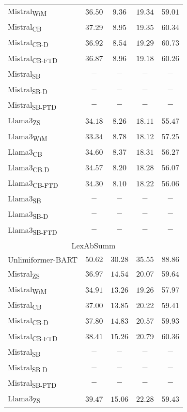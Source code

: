 \begin{table*}
\begin{tabular}{l c c c c}
Mistral\textsubscript{WiM}&$36.50$& $\mathbf{9.36}$& $19.34$& $59.01$\\
Mistral\textsubscript{CB}&$37.29$& $8.95$& $19.35$& $60.34$\\
Mistral\textsubscript{CB-D}&$36.92$& $8.54$& $19.29$& $60.73$\\
Mistral\textsubscript{CB-FTD}&$36.87$& $8.96$& $19.18$& $60.26$\\
Mistral\textsubscript{SB}&$-$& $-$& $-$& $-$\\
Mistral\textsubscript{SB-D}&$-$& $-$& $-$& $-$\\
Mistral\textsubscript{SB-FTD}&$-$& $-$& $-$& $-$\\
Llama3\textsubscript{ZS}&$34.18$& $8.26$& $18.11$& $55.47$\\
Llama3\textsubscript{WiM}&$33.34$& $8.78$& $18.12$& $57.25$\\
Llama3\textsubscript{CB}&$34.60$& $8.37$& $18.31$& $56.27$\\
Llama3\textsubscript{CB-D}&$34.57$& $8.20$& $18.28$& $56.07$\\
Llama3\textsubscript{CB-FTD}&$34.30$& $8.10$& $18.22$& $56.06$\\
Llama3\textsubscript{SB}&$-$& $-$& $-$& $-$\\
Llama3\textsubscript{SB-D}&$-$& $-$& $-$& $-$\\
Llama3\textsubscript{SB-FTD}&$-$& $-$& $-$& $-$\\
\midrule
\multicolumn{5}{c}{LexAbSumm \cite{DBLP:conf/coling/SantoshAG24}}\\
\midrule
Unlimiformer-BART \cite{DBLP:conf/coling/SantoshAG24} & $50.62$&$30.28$&$35.55$&$88.86$ \\
Mistral\textsubscript{ZS}&$36.97$& $14.54$& $20.07$& $59.64$\\
Mistral\textsubscript{WiM}&$34.91$& $13.26$& $19.26$& $57.97$\\
Mistral\textsubscript{CB}&$37.00$& $13.85$& $20.22$& $59.41$\\
Mistral\textsubscript{CB-D}&$37.80$& $14.83$& $20.57$& $59.93$\\
Mistral\textsubscript{CB-FTD}&$38.41$& $\mathbf{15.26}$& $20.79$& $\mathbf{60.36}$\\
Mistral\textsubscript{SB}&$-$& $-$& $-$& $-$\\
Mistral\textsubscript{SB-D}&$-$& $-$& $-$& $-$\\
Mistral\textsubscript{SB-FTD}&$-$& $-$& $-$& $-$\\
Llama3\textsubscript{ZS}&$\mathbf{39.47}$& $15.06$& $\mathbf{22.28}$& $59.43$\\

\end{tabular}
\end{table*}

